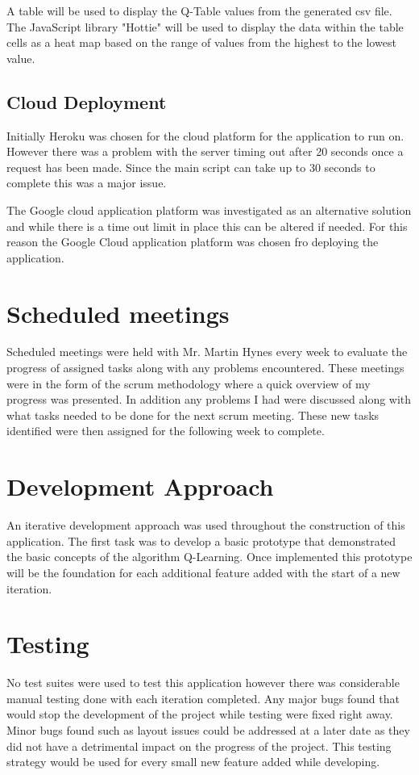 A table will be used to display the Q-Table values from the generated csv file.
The JavaScript library "Hottie" will be used to display the data within the table cells as a heat map based on the range of values from the highest to the lowest value.
\subsection{Cloud Deployment}
Initially Heroku was chosen for the cloud platform for the application to run on. However there was a problem with the server timing out after 20 seconds once a request has been made. Since the main script can take up to 30 seconds to complete this was a major issue.

The Google cloud application platform was investigated as an alternative solution and while there is a time out limit in place this can be altered if needed. For this reason the Google Cloud application platform was chosen fro deploying the application. 

\section {Scheduled meetings}
Scheduled meetings were held with Mr. Martin Hynes every week to evaluate the progress of assigned tasks along with any problems encountered. These meetings were in the form of the scrum methodology where a quick overview of my progress was presented. In addition any problems I had were discussed along with what tasks needed to be done for the next scrum meeting. 
These new tasks identified were then assigned for the following week to complete.

\section{Development Approach}
An iterative development approach was used throughout the construction of this application. The first task was to develop a basic prototype that demonstrated the basic concepts of the algorithm Q-Learning. Once implemented this prototype will be the foundation for each additional feature added with the start of a new iteration.  
\section{Testing}
No test suites were used to test this application however there was considerable manual testing done with each iteration completed. Any major bugs found that would stop the development of the project while testing were fixed right away. Minor bugs found such as layout issues could be addressed at a later date as they did not have a detrimental impact on the progress of the project. This testing strategy would be used for every small new feature added while developing. 
